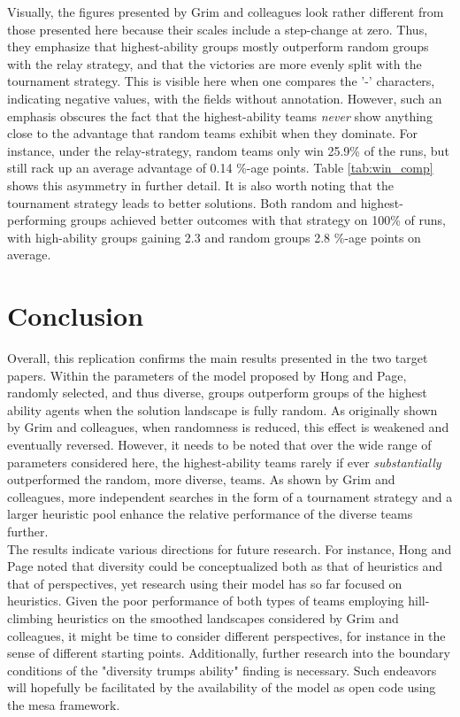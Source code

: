  Visually, the figures presented by Grim and colleagues look rather different from those presented here because their scales include a step-change at zero. Thus, they emphasize that highest-ability groups mostly outperform random groups with the relay strategy, and that the victories are more evenly split with the tournament strategy. This is visible here when one compares the '-' characters, indicating negative values, with the fields without annotation. However, such an emphasis obscures the fact that the highest-ability teams \textit{never} show anything close to the advantage that random teams exhibit when they dominate. For instance, under the relay-strategy, random teams only win 25.9\% of the runs, but still rack up an average advantage of 0.14 \%-age points. Table \ref{tab:win_comp} shows this asymmetry in further detail. It is also worth noting that the tournament strategy leads to better solutions. Both random and highest-performing groups achieved better outcomes with that strategy on 100\% of runs, with high-ability groups gaining 2.3 and random groups 2.8 \%-age points on average.
 

 \section{Conclusion}
 
 Overall, this replication confirms the main results presented in the two target papers. Within the parameters of the model proposed by Hong and Page, randomly selected, and thus diverse, groups outperform groups of the highest ability agents when the solution landscape is fully random. As originally shown by Grim and colleagues, when randomness is reduced, this effect is weakened and eventually reversed. However, it needs to be noted that over the wide range of parameters considered here, the highest-ability teams rarely if ever \textit{substantially} outperformed the random, more diverse, teams. As shown by Grim and colleagues, more independent searches in the form of a tournament strategy and a larger heuristic pool enhance the relative performance of the diverse teams further. \\

 The results indicate various directions for future research. For instance, Hong and Page noted that diversity could be conceptualized both as that of heuristics and that of perspectives, yet research using their model has so far focused on heuristics. Given the poor performance of both types of teams employing hill-climbing heuristics on the smoothed landscapes considered by Grim and colleagues, it might be time to consider different perspectives, for instance in the sense of different starting points. Additionally, further research into the boundary conditions of the "diversity trumps ability" finding is necessary. Such endeavors will hopefully be facilitated by the availability of the model as open code using the mesa framework. 
